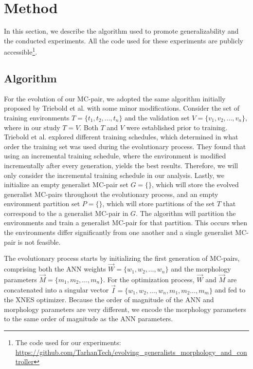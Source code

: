 
\section{Method}
    In this section, we describe the algorithm used to promote generalizability and the conducted experiments. All the code used for these experiments are publicly accessible\footnote{The code used for our experiments: \url{https://github.com/TarhanTech/evolving_generalists_morphology_and_controller}}.
    
    \subsection{Algorithm}
        
        For the evolution of our MC-pair, we adopted the same algorithm initially proposed by Triebold et al. \cite{Corinna_Triebold} with some minor modifications. Consider the set of training environments $T = \{t_1, t_2, \ldots, t_n\}$ and the validation set $V = \{v_1, v_2, \ldots, v_n\}$, where in our study $T = V$. Both $T$ and $V$ were established prior to training. Triebold et al. explored different training schedules, which determined in what order the training set was used during the evolutionary process. They found that using an incremental training schedule, where the environment is modified incrementally after every generation, yields the best results. Therefore, we will only consider the incremental training schedule in our analysis. Lastly, we initialize an empty generalist MC-pair set $G = \{\}$, which will store the evolved generalist MC-pairs throughout the evolutionary process, and an empty environment partition set $P = \{\}$, which will store partitions of the set $T$ that correspond to the a generalist MC-pair in $G$. The algorithm will partition the environments and train a generalist MC-pair for that partition. This occurs when the environments differ significantly from one another and a single generalist MC-pair is not feasible. 

        The evolutionary process starts by initializing the first generation of MC-pairs, comprising both the ANN weights $\overrightarrow{W} = \{w_1, w_2, \ldots, w_n\}$ and the morphology parameters $\overrightarrow{M} = \{m_1, m_2, \ldots, m_n\}$. For the optimization process, $\overrightarrow{W}$ and $\overrightarrow{M}$ are concatenated into a singular vector \newline $\overrightarrow{I} = \{w_1, w_2, \ldots, w_n, m_1, m_2 \ldots, m_m\}$ and fed to the XNES optimizer. Because the order of magnitude of the ANN and morphology parameters are very different, we encode the morphology parameters to the same order of magnitude as the ANN parameters.

